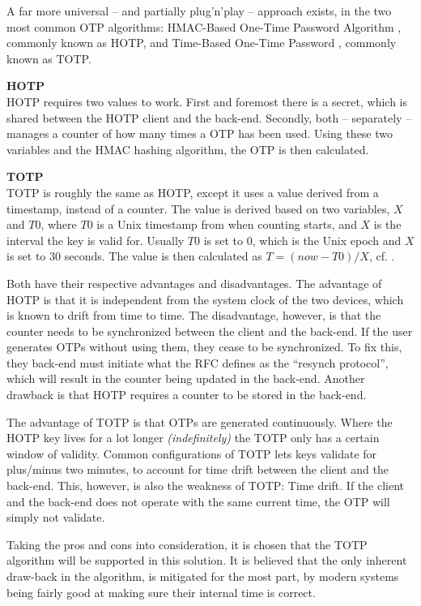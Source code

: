 				A far more universal -- and partially plug'n'play -- approach exists, in the two most common OTP algorithms: HMAC-Based One-Time Password Algorithm \cite{rfc4226}, commonly known as HOTP, and Time-Based One-Time Password \cite{rfc6238}, commonly known as TOTP. 

				\textbf{HOTP}\\
				HOTP requires two values to work. First and foremost there is a secret, which is shared between the HOTP client and the back-end. Secondly, both -- separately -- manages a counter of how many times a OTP has been used. Using these two variables and the HMAC hashing algorithm, the OTP is then calculated. 

				\textbf{TOTP}\\
				TOTP is roughly the same as HOTP, except it uses a value derived from a timestamp, instead of a counter. The value is derived based on two variables, $X$ and $T0$, where $T0$ is a Unix timestamp from when counting starts, and $X$ is the interval the key is valid for. Usually $T0$ is set to $0$, which is the Unix epoch and $X$ is set to $30$ seconds. The value is then calculated as $T = (now - T0)/X$, cf. \cite[Sec. 4.2]{rfc6238}.

				Both have their respective advantages and disadvantages. The advantage of HOTP is that it is independent from the system clock of the two devices, which is known to drift from time to time. The disadvantage, however, is that the counter needs to be synchronized between the client and the back-end. If the user generates OTPs without using them, they cease to be synchronized. To fix this, they back-end must initiate what the RFC defines as the ``resynch protocol'', which will result in the counter being updated in the back-end. Another drawback is that HOTP requires a counter to be stored in the back-end.

				The advantage of TOTP is that OTPs are generated continuously. Where the HOTP key lives for a lot longer \emph{(indefinitely)} the TOTP only has a certain window of validity. Common configurations of TOTP lets keys validate for plus/minus two minutes, to account for time drift between the client and the back-end. This, however, is also the weakness of TOTP: Time drift. If the client and the back-end does not operate with the same current time, the OTP will simply not validate.

				Taking the pros and cons into consideration, it is chosen that the TOTP algorithm will be supported in this solution. It is believed that the only inherent draw-back in the algorithm, is mitigated for the most part, by modern systems being fairly good at making sure their internal time is correct.

